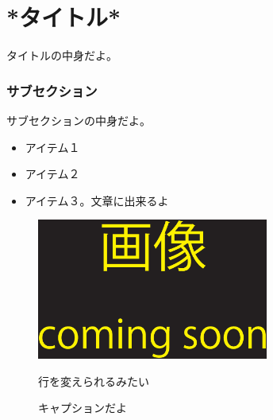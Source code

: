\chapter{*タイトル*}
\label{*Ltitle*}

タイトルの中身だよ。

\subsection{サブセクション}
\label{*Lsubsection*}

サブセクション\cite{*AuthorName*}の中身だよ。 %



\begin{itemize}
\item アイテム１
\item アイテム２
\item アイテム３。文章に出来るよ
\end{itemize}

\begin{figure}[h]
  \centering
  \includegraphics[width=3.0in]{./img/TEMP}
  \caption{キャプションだよ}{行を変えられるみたい}
  \label{test} %
\end{figure}
 
